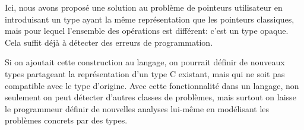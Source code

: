 Ici, nous avons proposé une solution au problème de pointeurs utilisateur en
introduisant un type ayant la même représentation que les pointeurs classiques,
mais pour lequel l'ensemble des opérations est différent: c'est un type opaque.
Cela suffit déjà à détecter des erreurs de programmation.

Si on ajoutait cette construction au langage, on pourrait définir de nouveaux
types partageant la représentation d'un type C existant, mais qui ne soit pas
compatible avec le type d'origine. Avec cette fonctionnalité dans un langage,
non seulement on peut détecter d'autres classes de problèmes, mais surtout on
laisse le programmeur définir de nouvelles analyses lui-même en modélisant les
problèmes concrets par des types.

